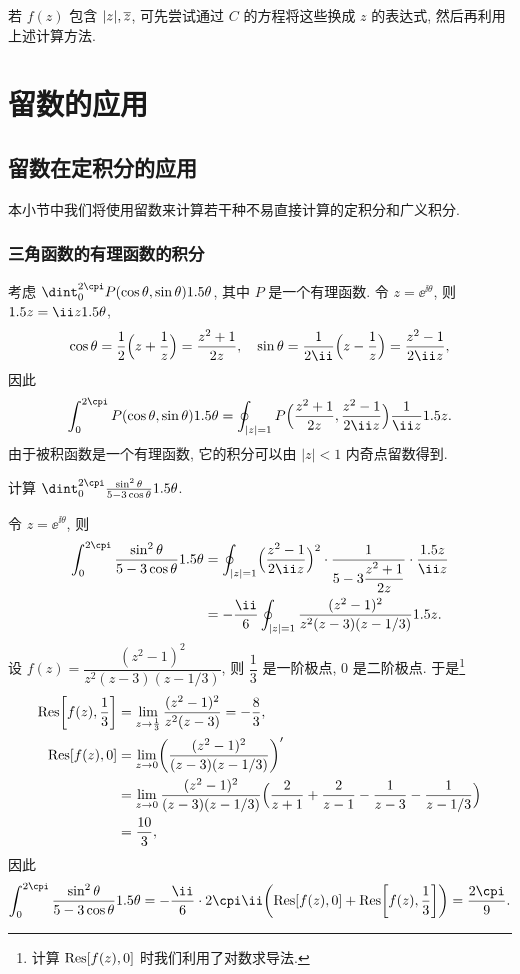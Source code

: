 若 $f(z)$ 包含 $|z|,\overline z$, 可先尝试通过 $C$ 的方程将这些换成 $z$ 的表达式, 然后再利用上述计算方法.



\section{留数的应用}

\subsection{留数在定积分的应用}

本小节中我们将使用留数来计算若干种不易直接计算的定积分和广义积分.

\subsubsection{三角函数的有理函数的积分}

考虑 $\dint_0^{2\cpi} P(\cos\theta,\sin\theta)\d\theta$, 其中 $P$ 是一个有理函数.
令 $z=\ee^{\ii \theta}$, 则 $\d z=\ii z\d\theta$,
\[
   \cos\theta
  =\half\Bigl(z+\frac1z\Bigr)
  =\frac{z^2+1}{2z},\quad
  \sin\theta
  =\frac1{2\ii}\Bigl(z-\frac1z\Bigr)
  =\frac{z^2-1}{2\ii z},
\]
因此
\[
   \int_0^{2\cpi} P(\cos\theta,\sin\theta)\d\theta
  =\oint_{|z|=1} P\Bigl(\frac{z^2+1}{2z},\frac{z^2-1}{2\ii z}\Bigr)\frac1{\ii z}\d z.
\]
由于被积函数是一个有理函数, 它的积分可以由 $|z|<1$ 内奇点留数得到.

\begin{example}
  计算 $\dint_0^{2\cpi}\frac{\sin^2\theta}{5-3\cos\theta}\d\theta$.
\end{example}

\begin{solution}
  令 $z=\ee^{\ii \theta}$, 则
  \begin{align*}
     \int_0^{2\cpi}\frac{\sin^2\theta}{5-3\cos\theta}\d\theta&
    =\oint_{|z|=1}\Bigl(\frac{z^2-1}{2\ii z}\Bigr)^2\cdot
      \frac1{5-3\dfrac{z^2+1}{2z}}\cdot\frac{\d z}{\ii z}\\&
    =-\frac\ii6\oint_{|z|=1}\frac{(z^2-1)^2}{z^2(z-3)(z-1/3)}\d z.
  \end{align*}
  设 $f(z)=\dfrac{(z^2-1)^2}{z^2(z-3)(z-1/3)}$, 则 $\dfrac13$ 是一阶极点, $0$ 是二阶极点.
  于是\footnote{
    计算 ${\mathrm{Res}}[f(z),0]$ 时我们利用了对数求导法.
  }
  \begin{align*}
     {\mathrm{Res}}\biggl[f(z),\frac13\biggr]&
    =\lim_{z\rightarrow \frac13}\frac{(z^2-1)^2}{z^2(z-3)}
    =-\frac83,\\
     {\mathrm{Res}}[f(z),0]&
    =\lim_{z\rightarrow 0}\biggl(\dfrac{(z^2-1)^2}{(z-3)(z-1/3)}\biggr)'\\&
    =\lim_{z\rightarrow 0}\dfrac{(z^2-1)^2}{(z-3)(z-1/3)}
      \Bigl(\frac2{z+1}+\frac2{z-1}-\frac1{z-3}-\frac1{z-1/3}\Bigr)\\&
    =\frac{10}3,
  \end{align*}
  因此
  \[
     \int_0^{2\cpi}\frac{\sin^2\theta}{5-3\cos\theta}\d\theta
    =-\frac\ii6\cdot 2\cpi\ii\biggl(\Res[f(z),0]+\Res\biggl[f(z),\frac13\biggr]\biggr)
    =\frac{2\cpi}9.
  \]
\end{solution}


